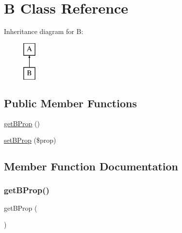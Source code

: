 \hypertarget{class_deep_copy_1_1f001_1_1_b}{}\section{B Class Reference}
\label{class_deep_copy_1_1f001_1_1_b}
Inheritance diagram for B\+:\begin{figure}[H]
\begin{center}
\leavevmode
\includegraphics[height=2.000000cm]{class_deep_copy_1_1f001_1_1_b}
\end{center}
\end{figure}
\subsection*{Public Member Functions}
\begin{DoxyCompactItemize}
\item 
\mbox{\hyperlink{class_deep_copy_1_1f001_1_1_b_ad34da7480b0331b1fc8dca0163376f59}{get\+B\+Prop}} ()
\item 
\mbox{\hyperlink{class_deep_copy_1_1f001_1_1_b_adeb42026a8c9c022200c5c7b7e2bba06}{set\+B\+Prop}} (\$prop)
\end{DoxyCompactItemize}


\subsection{Member Function Documentation}
\mbox{\label{class_deep_copy_1_1f001_1_1_b_ad34da7480b0331b1fc8dca0163376f59}} 
\subsubsection{\texorpdfstring{get\+B\+Prop()}{getBProp()}}
{\footnotesize\ttfamily get\+B\+Prop (\begin{DoxyParamCaption}{ }\end{DoxyParamCaption})}

\mbox{\label{class_deep_copy_1_1f001_1_1_b_adeb42026a8c9c022200c5c7b7e2bba06}} 
